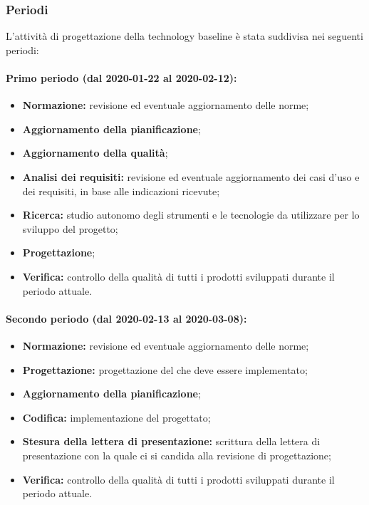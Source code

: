			\subsubsection{Periodi}
			
				L'attività di progettazione della technology baseline è stata suddivisa nei seguenti periodi:
				
				\paragraph{Primo periodo (dal 2020-01-22 al 2020-02-12):}
				
					\begin{itemize}
					 	\item \textbf{Normazione:} revisione ed eventuale aggiornamento delle norme;
					 	\item \textbf{Aggiornamento della pianificazione};
					 	\item \textbf{Aggiornamento della qualità};
					 	\item \textbf{Analisi dei requisiti:} revisione ed eventuale aggiornamento dei casi d'uso e dei requisiti, in base alle indicazioni ricevute;
					 	\item \textbf{Ricerca:} studio autonomo degli strumenti e le tecnologie da utilizzare per lo sviluppo del progetto;
					 	\item \textbf{Progettazione};
					 	\item \textbf{Verifica:} controllo della qualità di tutti i prodotti sviluppati durante il periodo attuale.
					\end{itemize} 	
				
				\paragraph{Secondo periodo (dal 2020-02-13 al 2020-03-08):}
				
					\begin{itemize}
						\item \textbf{Normazione:} revisione ed eventuale aggiornamento delle norme;
						\item \textbf{Progettazione:} progettazione del  che deve essere implementato;
						\item \textbf{Aggiornamento della pianificazione};
						\item \textbf{Codifica:} implementazione del  progettato;
						\item \textbf{Stesura della lettera di presentazione:} scrittura della lettera di presentazione con la quale ci si candida alla revisione di progettazione;
						\item \textbf{Verifica:} controllo della qualità di tutti i prodotti sviluppati durante il periodo attuale.
					\end{itemize}
		
